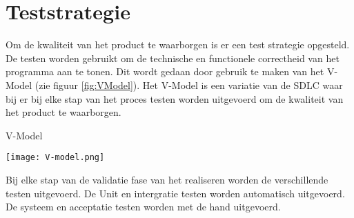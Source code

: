 \section{Teststrategie}
\label{section:Teststrategie}
Om de kwaliteit van het product te waarborgen is er een test strategie opgesteld.
De testen worden gebruikt om de technische en functionele correctheid van het programma aan te tonen.
Dit wordt gedaan door gebruik te maken van het V-Model \parencite{VModel} (zie figuur \ref{fig:VModel}).
Het V-Model is een variatie van de SDLC waar bij er bij elke stap van het proces testen worden uitgevoerd om de kwaliteit van het product te waarborgen.

\whitespace
\begin{graphic}
    \captionsetup{type=figure}
    \caption{V-Model \parencite{VModel}}
    \texttt{[image: V-model.png]}
    \label{fig:VModel}
\end{graphic}

\whitespace
Bij elke stap van de validatie fase van het realiseren worden de verschillende testen uitgevoerd.
De Unit en intergratie testen worden automatisch uitgevoerd.
De systeem en acceptatie testen worden met de hand uitgevoerd.
